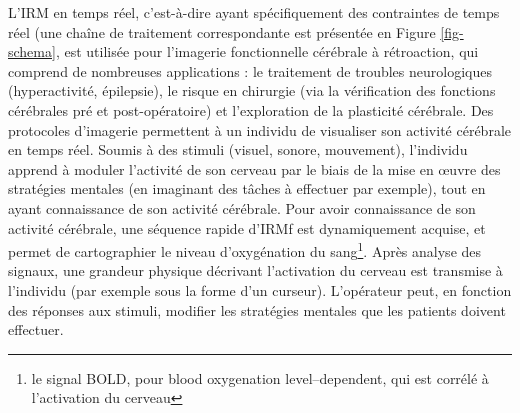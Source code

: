 
L’IRM en temps réel, c’est-à-dire ayant spécifiquement des contraintes de temps réel (une chaîne de traitement correspondante est présentée en Figure \ref{fig-schema}, est utilisée pour l’imagerie fonctionnelle cérébrale à rétroaction, qui comprend de nombreuses applications : le traitement de troubles neurologiques (hyperactivité, épilepsie), le risque en chirurgie (via la vérification des fonctions cérébrales pré et post-opératoire) et l’exploration de la plasticité cérébrale. Des protocoles d’imagerie permettent à un individu de visualiser son activité cérébrale en temps réel. Soumis à des stimuli (visuel, sonore, mouvement), l’individu apprend à moduler l’activité de son cerveau par le biais de la mise en œuvre des stratégies mentales (en imaginant des tâches à effectuer par exemple), tout en ayant connaissance de son activité cérébrale. Pour avoir connaissance de son activité cérébrale, une séquence rapide d’\ac{IRMf} est dynamiquement acquise, et permet de cartographier le niveau d’oxygénation du sang\footnote{le signal BOLD, pour blood oxygenation level–dependent, qui est corrélé à l’activation du cerveau}. Après analyse des signaux, une grandeur physique décrivant l’activation du cerveau est transmise à l’individu (par exemple sous la forme d’un curseur). L’opérateur peut, en fonction des réponses aux stimuli, modifier les stratégies mentales que les patients doivent effectuer.\\
